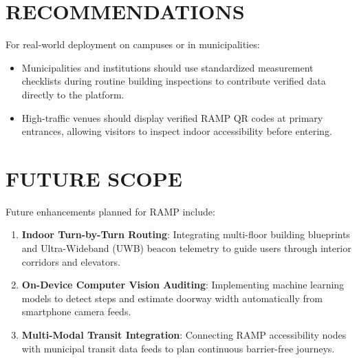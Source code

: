 \documentclass[12pt,a4paper]{report}
\begin{document}
\section{RECOMMENDATIONS}
For real-world deployment on campuses or in municipalities:
\begin{itemize}
    \item Municipalities and institutions should use standardized measurement checklists during routine building inspections to contribute verified data directly to the platform.
    \item High-traffic venues should display verified RAMP QR codes at primary entrances, allowing visitors to inspect indoor accessibility before entering.
\end{itemize}

\section{FUTURE SCOPE}
Future enhancements planned for RAMP include:
\begin{enumerate}
    \item \textbf{Indoor Turn-by-Turn Routing}: Integrating multi-floor building blueprints and Ultra-Wideband (UWB) beacon telemetry to guide users through interior corridors and elevators.
    \item \textbf{On-Device Computer Vision Auditing}: Implementing machine learning models to detect steps and estimate doorway width automatically from smartphone camera feeds.
    \item \textbf{Multi-Modal Transit Integration}: Connecting RAMP accessibility nodes with municipal transit data feeds to plan continuous barrier-free journeys.
\end{enumerate}
\end{document}
